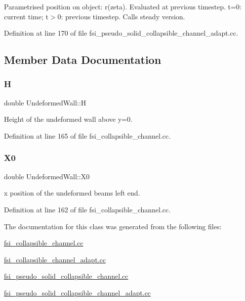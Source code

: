 Parametrised position on object\+: r(zeta). Evaluated at previous timestep. t=0\+: current time; t$>$0\+: previous timestep. Calls steady version. 



Definition at line 170 of file fsi\+\_\+pseudo\+\_\+solid\+\_\+collapsible\+\_\+channel\+\_\+adapt.\+cc.



\subsection{Member Data Documentation}
\mbox{\label{classUndeformedWall_a4525dbe0b5d2108ee51f16bee9af88ef}} 
\subsubsection{\texorpdfstring{H}{H}}
{\footnotesize\ttfamily double Undeformed\+Wall\+::H\hspace{0.3cm}{\ttfamily [private]}}



Height of the undeformed wall above y=0. 



Definition at line 165 of file fsi\+\_\+collapsible\+\_\+channel.\+cc.

\mbox{\label{classUndeformedWall_a7ab875c46fef905df33eb47e0336581b}} 
\subsubsection{\texorpdfstring{X0}{X0}}
{\footnotesize\ttfamily double Undeformed\+Wall\+::\+X0\hspace{0.3cm}{\ttfamily [private]}}



x position of the undeformed beam\textquotesingle{}s left end. 



Definition at line 162 of file fsi\+\_\+collapsible\+\_\+channel.\+cc.



The documentation for this class was generated from the following files\+:\begin{DoxyCompactItemize}
\item 
\hyperlink{fsi__collapsible__channel_8cc}{fsi\+\_\+collapsible\+\_\+channel.\+cc}\item 
\hyperlink{fsi__collapsible__channel__adapt_8cc}{fsi\+\_\+collapsible\+\_\+channel\+\_\+adapt.\+cc}\item 
\hyperlink{fsi__pseudo__solid__collapsible__channel_8cc}{fsi\+\_\+pseudo\+\_\+solid\+\_\+collapsible\+\_\+channel.\+cc}\item 
\hyperlink{fsi__pseudo__solid__collapsible__channel__adapt_8cc}{fsi\+\_\+pseudo\+\_\+solid\+\_\+collapsible\+\_\+channel\+\_\+adapt.\+cc}\end{DoxyCompactItemize}
